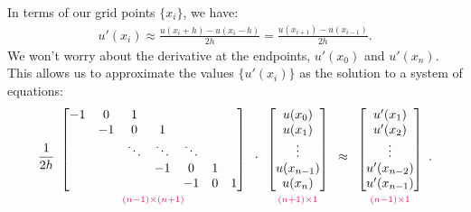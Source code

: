 In terms of our grid points $\{x_i\}$, we have:
\begin{align*}
u'(x_i) \approx \frac{u(x_i+h)-u(x_i-h)}{2h}=\frac{u(x_{i+1})-u(x_{i-1})}{2h}.
\end{align*}
We won't worry about the derivative at the endpoints, $u'(x_0)$ and $u'(x_n)$.
This allows us to approximate the values $\{u'(x_i)\}$ as the solution to a system of equations:
\begin{align}
\frac{1}{2h}
\begin{array}{c}
\begin{bmatrix}
-1 &0 & 1 & \\
& -1 & 0 & 1  \\
& & \ddots & \ddots & \ddots & \\
& & & -1 & 0 & 1 \\
& & & & -1 & 0 & 1
\end{bmatrix}\\
{\scriptstyle\textcolor{red}{(n-1)\times(n+1)}}
\end{array}\cdot
\begin{array}{c}
\begin{bmatrix}
u(x_0) \\ u(x_1)\\ \vdots  \\ u(x_{n-1}) \\ u(x_n)
\end{bmatrix}\\
{\scriptstyle\textcolor{red}{(n+1)\times1}}
\end{array} \approx
\begin{array}{c}
\begin{bmatrix}
u'(x_1) \\ u'(x_2)\\ \vdots  \\ u'(x_{n-2}) \\ u'(x_{n-1})
\end{bmatrix}\\
{\scriptstyle\textcolor{red}{(n-1)\times1}}
\end{array}.
\label{finitedifference2:up}
\end{align}

